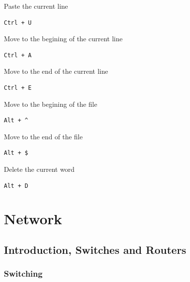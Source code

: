 \documentclass{article}
\newenvironment{codetemplate}[1][]{%
  \mybasecolorbox[#1]
  \itshape
}{%
  \endmybasecolorbox
}
\begin{document}
Paste the current line
\begin{codetemplate}{}
\begin{verbatim}
Ctrl + U
\end{verbatim}
\end{codetemplate}

Move to the begining of the current line
\begin{codetemplate}{}
\begin{verbatim}
Ctrl + A
\end{verbatim}
\end{codetemplate}

Move to the end of the current line
\begin{codetemplate}{}
\begin{verbatim}
Ctrl + E
\end{verbatim}
\end{codetemplate}

Move to the begining of the file
\begin{codetemplate}{}
\begin{verbatim}
Alt + ^
\end{verbatim}
\end{codetemplate}

Move to the end of the file
\begin{codetemplate}{}
\begin{verbatim}
Alt + $
\end{verbatim}
\end{codetemplate}

Delete the current word
\begin{codetemplate}{}
\begin{verbatim}
Alt + D
\end{verbatim}
\end{codetemplate}


\newpage
\section{Network}

\subsection{Introduction, Switches and Routers}

\subsubsection{Switching}
\end{document}
